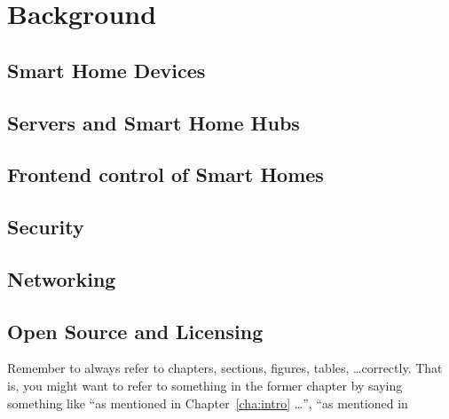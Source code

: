 \chapter{Background} \label{cha:chapter2}

\section{Smart Home Devices} \label{sec:chap2:devices}
\section{Servers and Smart Home Hubs} \label{sec:chap2:servers}
\section{Frontend control of Smart Homes} \label{sec:chap2:servers}
\section{Security} \label{sec:chap2:security}
\section{Networking} \label{sec:chap2:networking}
\section{Open Source and Licensing} \label{sec:chap2:opensource}
 

Remember to always refer to chapters, sections, figures, tables,
\ldots correctly. That is, you might want to refer to something in the
former chapter by saying something like ``as mentioned in
Chapter~\ref{cha:intro} \ldots'', ``as mentioned in
